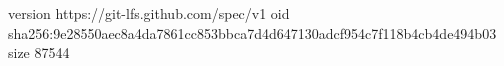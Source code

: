 version https://git-lfs.github.com/spec/v1
oid sha256:9e28550aec8a4da7861cc853bbca7d4d647130adcf954c7f118b4cb4de494b03
size 87544
